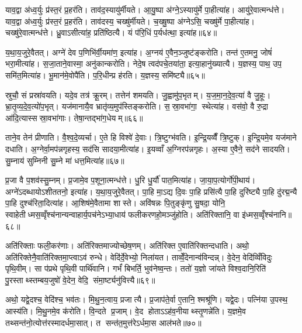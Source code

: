 याव॒द्वा अ॑ध्व॒र्युः प्र॑स्त॒रं प्र॒हर॑ति। ताव॑द॒स्यायु॑र्मीयते। आ॒यु॒ष्पा अ॑ग्ने॒ऽस्यायु॑र्मे पा॒हीत्या॑ह। आयु॑रे॒वात्मन्ध॑त्ते। याव॒द्वा अ॑ध्व॒र्युः प्र॑स्त॒रं प्र॒हर॑ति। ताव॑दस्य॒ चख्षु॑र्मीयते। च॒ख्षु॒ष्पा अ॑ग्नेऽसि॒ चख्षु॑र्मे पा॒हीत्या॑ह। चख्षु॑रे॒वात्मन्ध॑त्ते। ध्रु॒वाऽसीत्या॑ह॒ प्रति॑ष्ठित्यै। यं प॑रि॒धिं प॒र्यध॑त्था॒ इत्या॑ह॥६४॥

य॒था॒य॒जुरे॒वैतत्। अग्ने॑ देव प॒णिभि॑र्वी॒यमा॑ण॒ इत्या॑ह। अ॒ग्नय॑ ए॒वैन॒ञ्जुष्ट॑ङ्करोति। तन्त॑ ए॒तमनु॒ जोषं॑ भरा॒मीत्या॑ह। स॒जा॒ताने॒वास्मा॒ अनु॑कान्करोति। नेदे॒ष त्वद॑पचे॒तया॑ता॒ इत्या॒हानु॑ख्यात्यै। य॒ज्ञस्य॒ पाथ॒ उप॒ समि॑त॒मित्या॑ह। भू॒मान॑मे॒वोपै॑ति। प॒रि॒धीन्प्र ह॑रति। य॒ज्ञस्य॒ समि॑ष्ट्यै॥६५॥

स्रुचौ॒ सं प्रस्रा॑वयति। यदे॒व तत्र॑ क्रू॒रम्। तत्तेन॑ शमयति। जु॒ह्वामु॑प॒भृतम्। य॒ज॒मा॒न॒दे॒व॒त्या॑ वै जु॒हूः। भ्रा॒तृ॒व्य॒दे॒व॒त्यो॑प॒भृत्। यज॑मानायै॒व भ्रातृ॑व्य॒मुप॑स्तिङ्करोति। स॒स्रा॒वभा॑गा॒ स्थेत्या॑ह। वस॑वो॒ वै रु॒द्रा आ॑दि॒त्यास्सस्रा॒वभा॑गाः। तेषा॒न्तद्भा॑ग॒धेयम्॥६६॥

ताने॒व तेन॑ प्रीणाति। वै॒श्व॒दे॒व्यर्चा। ए॒ते हि विश्वे॑ दे॒वाः। त्रि॒ष्टुग्भ॑वति। इ॒न्द्रि॒यव्वैँ त्रि॒ष्टुक्। इ॒न्द्रि॒यमे॒व यज॑माने दधाति। अ॒ग्नेर्वा॒मप॑न्नगृहस्य॒ सद॑सि सादया॒मीत्या॑ह। इ॒यव्वाँ अ॒ग्निरप॑न्नगृहः। अ॒स्या ए॒वैने॒ सद॑ने सादयति। सु॒म्नाय॑ सुम्निनी सु॒म्ने मा॑ धत्त॒मित्या॑ह॥६७॥

प्र॒जा वै प॒शव॑स्सु॒म्नम्। प्र॒जामे॒व प॒शूना॒त्मन्ध॑त्ते। धु॒रि धु॒र्यौ॑ पात॒मित्या॑ह। जा॒या॒प॒त्योर्गो॑पी॒थाय॑। अग्ने॑ऽदब्धायोऽशीततनो॒ इत्या॑ह। य॒था॒य॒जुरे॒वैतत्। पा॒हि मा॒ऽद्य दि॒वः पा॒हि प्रसि॑त्यै पा॒हि दुरि॑ष्ट्यै पा॒हि दु॑रद्म॒न्यै पा॒हि दुश्च॑रिता॒दित्या॑ह। आ॒शिष॑मे॒वैतामा शास्ते। अवि॑षन्नः पि॒तुङ्कृ॑णु सु॒षदा॒ योनि॒ स्वाहेतीध्मस॒व्वृँश्च॑नान्यन्वाहार्य॒पच॑नेऽभ्या॒धाय॑ फलीकरणहो॒मञ्जु॑होति। अति॑रिक्तानि॒ वा इ॑ध्मस॒व्वृँश्च॑नानि॥६८॥

अति॑रिक्ताः फली॒कर॑णाः। अति॑रिक्तमाज्योच्छेष॒णम्। अति॑रिक्त ए॒वाति॑रिक्तन्दधाति। अथो॒ अति॑रिक्तेनै॒वाति॑रिक्तमा॒प्त्वाऽव॑ रुन्धे। वेदि॑र्दे॒वेभ्यो॒ निला॑यत। ताव्वेँ॒देनान्व॑विन्दन्न्। वे॒देन॒ वेदि॑व्विँविदुः पृथि॒वीम्। सा प॑प्रथे पृथि॒वी पार्थि॑वानि। गर्भं॑ बिभर्ति॒ भुव॑नेष्व॒न्तः। ततो॑ य॒ज्ञो जा॑यते विश्व॒दानि॒रिति॑ पु॒रस्ताथ्स्तम्बय॒जुषो॑ वे॒देन॒ वेदि॒ संमा॒र्ष्ट्यनु॑वित्त्यै॥६९॥

अथो॒ यद्वे॒दश्च॒ वेदि॑श्च॒ भव॑तः। मि॒थु॒न॒त्वाय॒ प्रजात्यै। प्र॒जाप॑ते॒र्वा ए॒तानि॒ श्मश्रू॑णि। यद्वे॒दः। पत्नि॑या उ॒पस्थ॒ आस्य॑ति। मि॒थु॒नमे॒व क॑रोति। वि॒न्दते प्र॒जाम्। वे॒द होताऽऽह॑व॒नीयाथ्स्तृ॒णन्ने॑ति। य॒ज्ञमे॒व तथ्सन्त॑नो॒त्योत्त॑रस्मादर्धमा॒सात्। त सन्त॑त॒मुत्त॑रेऽर्धमा॒स आल॑भते॥७०॥

